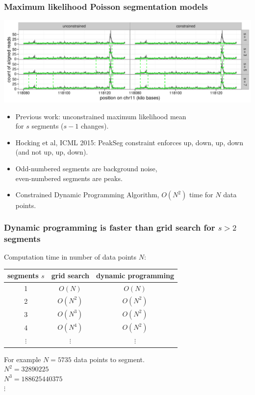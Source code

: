 \documentclass{beamer}
\begin{document}
\begin{frame}
  \frametitle{Maximum likelihood Poisson segmentation models}
  \includegraphics[width=1\textwidth]{figure-Segmentor-PeakSeg}

  \begin{itemize}
  \item Previous work: unconstrained maximum likelihood mean\\
    for $s$ segments ($s-1$ changes).
  \item Hocking et al, ICML 2015: PeakSeg constraint enforces up, down, up,
    down (and not up, up, down). 
  \item Odd-numbered segments are background noise,\\
    even-numbered segments are peaks.
  \item Constrained Dynamic Programming Algorithm, $O(N^2)$ time for $N$ data points.
  \end{itemize}
\end{frame}







\begin{frame}
  \frametitle{Dynamic programming is faster than grid search for $s>
    2$ segments}

  Computation time in number of data points $N$:

  \vskip 1cm

  \begin{tabular}{ccc}
    segments $s$ & grid search & dynamic programming \\
    \hline
    1 & $O(N)$ & $O(N)$ \\
    2 & $O(N^2)$ & $O(N^2)$ \\
    3 & $O(N^3)$ & $O(N^2)$ \\
    4 & $O(N^4)$ & $O(N^2)$ \\
    $\vdots$ &     $\vdots$ &     $\vdots$ 
  \end{tabular}

  \vskip 1cm

  For example $N = 5735$ data points to segment.\\
  $N^2 = 32890225$\\
  $N^3 = 188625440375$\\
  $\vdots$
\end{frame}
\end{document}
